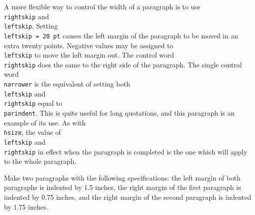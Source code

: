 {\narrower 
A more flexible way to control the width of a paragraph is to use 
{\tt \\rightskip} and {\tt \\leftskip}.  Setting {\tt \\leftskip 
= 20 pt} causes the left margin of the paragraph to be moved in 
an extra twenty points. Negative values may be assigned to {\tt 
\\leftskip} to move the left margin out. The control word {\tt 
\\rightskip} does the same to the right side of the paragraph. 
The single control word {\tt \\narrower} is the equivalent of 
setting both {\tt \\leftskip} and {\tt \\rightskip} equal to {\tt 
\\parindent}.  This is quite useful for long quotations, and 
this paragraph is an example of its use. As with {\tt \\hsize}, 
the value of {\tt \\leftskip} and {\tt \\rightskip} in effect 
when the paragraph is completed is the one which will apply to 
the whole paragraph. 
 
} 
 
\exercise Make two paragraphs with the following specifications: 
the left margin of both paragraphs is indented by 1.5 inches, 
the right margin of the first paragraph is indented by 0.75 
inches, and the right margin of the second paragraph is indented 
by 1.75 inches. 
\bigskip 
 
